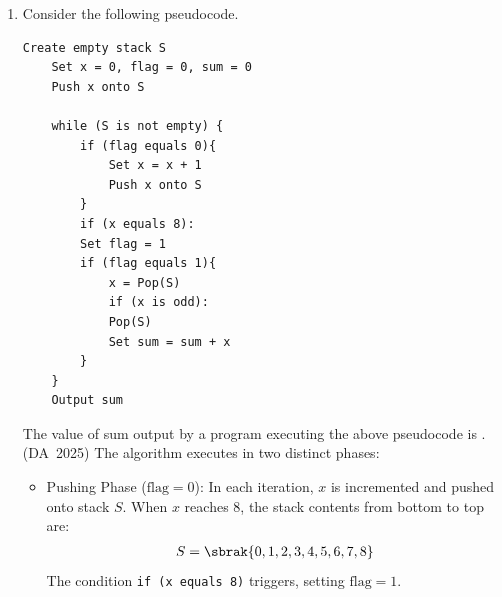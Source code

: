 \begin{enumerate}[label=\thesubsection.\arabic*, ref=\thesubsection.\theenumi]
\begin{lstlisting}[frame=single, basicstyle=\rmfamily, xleftmargin=0pt]
print(f(15, 10))
\end{lstlisting}
The value printed by the code snippet is \underline{\hspace{1.5cm}}.
\hfill (DA~2025)
\\
\solution
The function $f(a, b)$ is defined recursively. Whenever $a$ is odd ($a \pmod 2 = 1$), it branches into $2 \cdot f\brak{\frac{a-1}{2}, b}$. Unrolling the recursive calls starting with $a = 15$ and $b = 10$:
\begin{align}
	f(15, 10) &= 2 \cdot f(7, 10) \\
	f(7, 10)  &= 2 \cdot f(3, 10) \\
	f(3, 10)  &= 2 \cdot f(1, 10) \\
	f(1, 10)  &= 2 \cdot f(0, 10)
\end{align}
When $a = 0$, the base condition triggers and returns $b = 10$:
\begin{align}
	f(0, 10) &= 10
\end{align}
Substituting the base case back into the recurrence:
\begin{align}
	f(15, 10) &= 2^4 \cdot f(0, 10) = 16 \times 10 = 160
\end{align}
Thus, the value printed by the code snippet is $160$.

The following code verifies the solution
\begin{lstlisting}[frame=single, basicstyle=\rmfamily, escapeinside={(*@}{@*)}]
(*@\makebox[\dimexpr\linewidth-2\fboxsep-2\fboxrule\relax][c]{codes/q44/q44.py}@*)
\end{lstlisting}
\item 
Consider the following pseudocode.
\begin{lstlisting}[frame=single, basicstyle=\rmfamily, xleftmargin=0pt]
	Create empty stack S
	Set x = 0, flag = 0, sum = 0
	Push x onto S
	
	while (S is not empty) {
		if (flag equals 0){
			Set x = x + 1
			Push x onto S
		}
		if (x equals 8):
		Set flag = 1
		if (flag equals 1){
			x = Pop(S)
			if (x is odd):
			Pop(S)
			Set sum = sum + x
		}
	}
	Output sum
\end{lstlisting}
The value of sum output by a program executing the above pseudocode is \underline{\hspace{1.5cm}}.
\hfill (DA~2025)
\solution
The algorithm executes in two distinct phases:
\begin{itemize}
	\item Pushing Phase ($\text{flag} = 0$):
	In each iteration, $x$ is incremented and pushed onto stack $S$. When $x$ reaches $8$, the stack contents from bottom to top are:
	\begin{align}
		S = \sbrak{0, 1, 2, 3, 4, 5, 6, 7, 8}
	\end{align}
	The condition \texttt{if (x equals 8)} triggers, setting $\text{flag} = 1$.
	

\end{itemize}
\end{enumerate}
